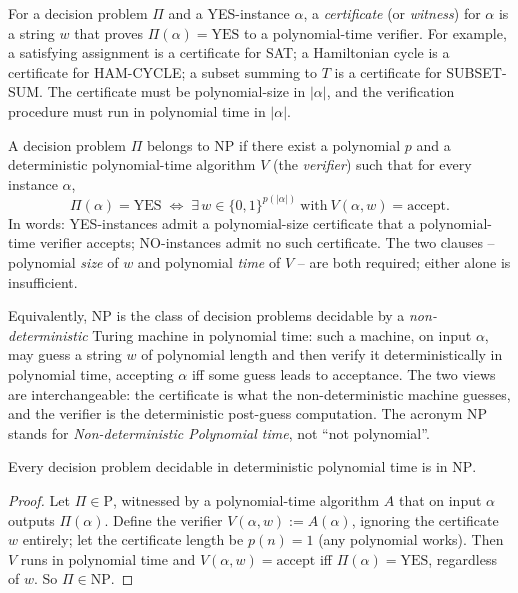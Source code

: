\begin{definition}
\label{def:certificate}
For a decision problem $\Pi$ and a YES-instance $\alpha$, a \emph{certificate} (or \emph{witness}) for $\alpha$ is a string $w$ that proves $\Pi(\alpha) = \text{YES}$ to a polynomial-time verifier. For example, a satisfying assignment is a certificate for SAT; a Hamiltonian cycle is a certificate for HAM-CYCLE; a subset summing to $T$ is a certificate for SUBSET-SUM. The certificate must be polynomial-size in $|\alpha|$, and the verification procedure must run in polynomial time in $|\alpha|$.
\end{definition}

\begin{definition}[Class NP]
\label{def:class_np}
A decision problem $\Pi$ belongs to $\mathrm{NP}$ if there exist a polynomial $p$ and a deterministic polynomial-time algorithm $V$ (the \emph{verifier}) such that for every instance $\alpha$,
\[
  \Pi(\alpha) = \text{YES} \;\iff\; \exists\, w \in \{0,1\}^{p(|\alpha|)}\ \text{with}\ V(\alpha, w) = \text{accept}.
\]
In words: YES-instances admit a polynomial-size certificate that a polynomial-time verifier accepts; NO-instances admit no such certificate. The two clauses -- polynomial \emph{size} of $w$ and polynomial \emph{time} of $V$ -- are both required; either alone is insufficient.
\end{definition}

\begin{remark}
Equivalently, $\mathrm{NP}$ is the class of decision problems decidable by a \emph{non-deterministic} Turing machine in polynomial time: such a machine, on input $\alpha$, may guess a string $w$ of polynomial length and then verify it deterministically in polynomial time, accepting $\alpha$ iff some guess leads to acceptance. The two views are interchangeable: the certificate is what the non-deterministic machine guesses, and the verifier is the deterministic post-guess computation. The acronym NP stands for \emph{Non-deterministic Polynomial time}, not ``not polynomial''.
\end{remark}

\begin{proposition}
\label{prop:p_subset_np}
Every decision problem decidable in deterministic polynomial time is in $\mathrm{NP}$.
\end{proposition}

\begin{proof}
Let $\Pi \in \mathrm{P}$, witnessed by a polynomial-time algorithm $A$ that on input $\alpha$ outputs $\Pi(\alpha)$. Define the verifier $V(\alpha, w) := A(\alpha)$, ignoring the certificate $w$ entirely; let the certificate length be $p(n) = 1$ (any polynomial works). Then $V$ runs in polynomial time and $V(\alpha, w) = \text{accept}$ iff $\Pi(\alpha) = \text{YES}$, regardless of $w$. So $\Pi \in \mathrm{NP}$.
\end{proof}

